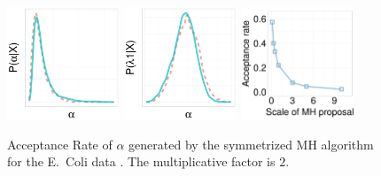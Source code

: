   \begin{figure}[H]
  \centering

  \begin{minipage}[!hp]{0.99\linewidth}
	\centering
    \includegraphics [width=0.3\textwidth, angle=0]{figs/ecoli_ks/ecoli_alphahist_31_3_0_.pdf}
    \includegraphics [width=0.3\textwidth, angle=0]{figs/ecoli_ks/ecoli_l1hist_31_3_0_.pdf}
    \includegraphics [width=0.30\textwidth, angle=0]{figs/acc/ecolialpha_k2.pdf}
  \end{minipage}
    \caption{Acceptance Rate of $\alpha$ generated by the symmetrized MH algorithm for the E.\ Coli data . The multiplicative factor is $2$. }
     \label{fig:ACC_ECOLI}
  \end{figure}

